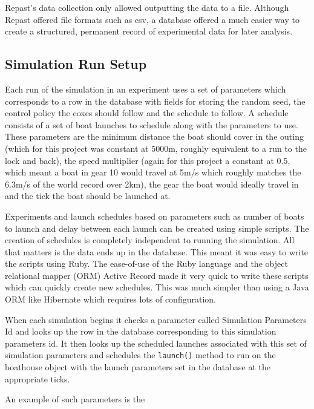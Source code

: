   Repast's data collection only allowed outputting the data to a file. Although Repast offered file formats such as csv, a database offered a much easier way to create a structured, permanent record of experimental data for later analysis.
  
  \subsection{Simulation Run Setup}
  Each run of the simulation in an experiment uses a set of parameters which corresponds to a row in the database with fields for storing the random seed, the control policy the coxes should follow and the schedule to follow. A schedule consists of a set of boat launches to schedule along with the parameters to use. These parameters are the minimum distance the boat should cover in the outing (which for this project was constant at 5000m, roughly equivalent to a run to the lock and back), the speed multiplier (again for this project a constant at 0.5, which meant a boat in gear 10 would travel at 5m/s which roughly matches the 6.3m/s of the world record over 2km), the gear the boat would ideally travel in and the tick the boat should be launched at.
  
  Experiments and launch schedules based on parameters such as number of boats to launch and delay between each launch can be created using simple scripts. The creation of schedules is completely independent to running the simulation. All that matters is the data ends up in the database. This meant it was easy to write the scripts using Ruby. The ease-of-use of the Ruby language and the object relational mapper (ORM) Active Record made it very quick to write these scripts which can quickly create new schedules. This was much simpler than using a Java ORM like Hibernate which requires lots of configuration.
  
  When each simulation begins it checks a parameter called Simulation Parameters Id and looks up the row in the database corresponding to this simulation parameters id. It then looks up the scheduled launches associated with this set of simulation parameters and schedules the \texttt{launch()} method to run on the boathouse object with the launch parameters set in the database at the appropriate ticks.
  
    An example of such parameters is the 
  
